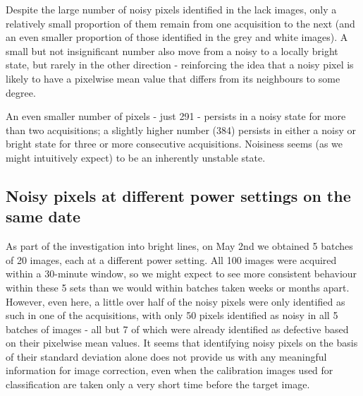 \documentclass[10pt,fleqn]{article}
\begin{document}
Despite the large number of noisy pixels identified in the lack images, only a relatively small proportion of them remain from one acquisition to the next (and an even smaller proportion of those identified in the grey and white images). A small but not insignificant number also move from a noisy to a locally bright state, but rarely in the other direction - reinforcing the idea that a noisy pixel is likely to have a pixelwise mean value that differs from its neighbours to some degree.

An even smaller number of pixels - just 291 - persists in a noisy state for more than two acquisitions; a slightly higher number (384) persists in either a noisy or bright state for three or more consecutive acquisitions. Noisiness seems (as we might intuitively expect) to be an inherently unstable state.


\FloatBarrier
\subsection{Noisy pixels at different power settings on the same date}

As part of the investigation into bright lines, on May 2nd we obtained 5 batches of 20 images, each at a different power setting. All 100 images were acquired within a 30-minute window, so we might expect to see more consistent behaviour within these 5 sets than we would within batches taken weeks or months apart. However, even here, a little over half of the noisy pixels were only identified as such in one of the acquisitions, with only 50 pixels identified as noisy in all 5 batches of images - all but 7 of which were already identified as defective based on their pixelwise mean values. It seems that identifying noisy pixels on the basis of their standard deviation alone does not provide us with any meaningful information for image correction, even when the calibration images used for classification are taken only a very short time before the target image.
\end{document}

